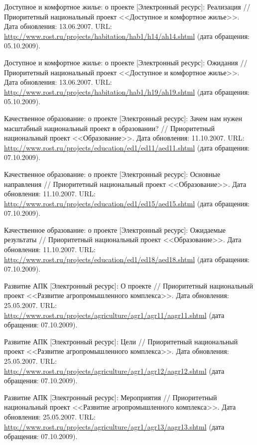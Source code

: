 \begin{thebibliography}{99}
 Доступное и комфортное жилье: о проекте
  [Электронный ресурс]: Реализация // Приоритетный национальный проект
  <<Доступное и комфортное жилье>>. Дата обновления: 13.06.2007. URL:
  \url{http://www.rost.ru/projects/habitation/hab1/h14/ah14.shtml}
  (дата обращения: 05.10.2009).

 Доступное и комфортное жилье: о проекте
  [Электронный ресурс]: Ожидания // Приоритетный национальный проект
  <<Доступное и комфортное жилье>>. Дата обновления: 13.06.2007. URL:
  \url{http://www.rost.ru/projects/habitation/hab1/h19/ah19.shtml}
  (дата обращения: 05.10.2009).

 Качественное образование: о проекте
  [Электронный ресурс]: Зачем нам нужен масштабный национальный проект
  в образовании? // Приоритетный национальный проект
  <<Образование>>. Дата обновления: 11.10.2007. URL:
  \url{http://www.rost.ru/projects/education/ed1/ed11/aed11.shtml}
  (дата обращения: 07.10.2009).

 Качественное образование: о проекте [Электронный
  ресурс]: Основные направления // Приоритетный национальный проект
  <<Образование>>. Дата обновления: 11.10.2007. URL:
  \url{http://www.rost.ru/projects/education/ed1/ed15/aed15.shtml}
  (дата обращения: 07.10.2009).

 Качественное образование: о проекте
  [Электронный ресурс]: Ожидаемые результаты // Приоритетный
  национальный проект <<Образование>>. Дата обновления:
  11.10.2007. URL:
  \url{http://www.rost.ru/projects/education/ed1/ed18/aed18.shtml}
  (дата обращения: 07.10.2009).

 Развитие АПК [Электронный ресурс]: О проекте //
  Приоритетный национальный проект <<Развитие агропромышленного
  комплекса>>. Дата обновления: 25.05.2007. URL:
  \url{http://www.rost.ru/projects/agriculture/agr1/agr11/aagr11.shtml}
  (дата обращения: 07.10.2009).

 Развитие АПК [Электронный ресурс]: Цели //
  Приоритетный национальный проект <<Развитие агропромышленного
  комплекса>>. Дата обновления: 25.05.2007. URL:
  \url{http://www.rost.ru/projects/agriculture/agr1/agr12/aagr12.shtml}
  (дата обращения: 07.10.2009).

 Развитие АПК [Электронный ресурс]: Мероприятия //
  Приоритетный национальный проект <<Развитие агропромышленного
  комплекса>>. Дата обновления: 25.05.2007. URL:
  \url{http://www.rost.ru/projects/agriculture/agr1/agr13/aagr13.shtml}
  (дата обращения: 07.10.2009).
  
\end{thebibliography}

